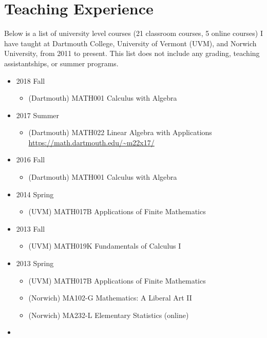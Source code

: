 \documentclass[a4paper]{adcv}
\begin{document}
\section{Teaching Experience}

Below is a list of university level courses
(21 classroom courses, 5 online courses)
I have taught at
Dartmouth College,
University of Vermont (UVM),
and
Norwich University,
from 2011 to present.
This list does not include any grading, teaching assistantships,
or summer programs.
\begin{itemize}
  \item
    2018 Fall
    \begin{itemize}
      \item
        (Dartmouth) MATH001 Calculus with Algebra
    \end{itemize}
  \item
    2017 Summer
    \begin{itemize}
      \item
        (Dartmouth) MATH022 Linear Algebra with Applications
        \newline
        \url{https://math.dartmouth.edu/~m22x17/}
    \end{itemize}
  \item
    2016 Fall
    \begin{itemize}
      \item
        (Dartmouth) MATH001 Calculus with Algebra
    \end{itemize}
  \item
    2014 Spring
    \begin{itemize}
      \item (UVM) MATH017B Applications of Finite Mathematics
    \end{itemize}
  \item
    2013 Fall
    \begin{itemize}
      \item (UVM) MATH019K Fundamentals of Calculus I
    \end{itemize}
  \item
    2013 Spring
    \begin{itemize}
      \item (UVM) MATH017B Applications of Finite Mathematics
      \item (Norwich) MA102-G Mathematics: A Liberal Art II
      \item (Norwich) MA232-L Elementary Statistics (online)
    \end{itemize}
  \item

\end{itemize}
\end{document}
